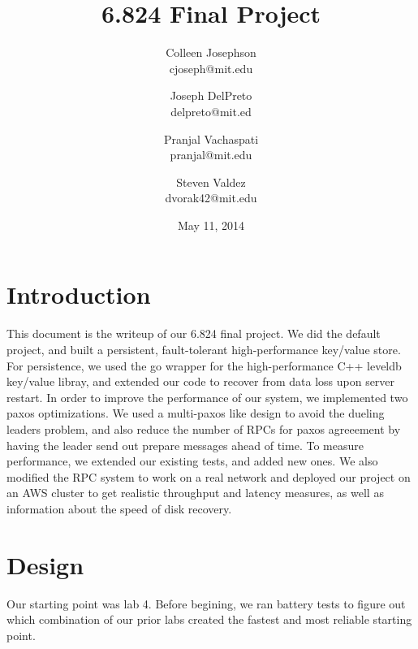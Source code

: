 \documentclass[letterpaper,10pt]{article}
\begin{document}
\title{\Large \bf 6.824 Final Project}
\author{
{\rm Colleen Josephson}\\
cjoseph@mit.edu
\and
{\rm Joseph DelPreto}\\
delpreto@mit.ed
\and
{\rm Pranjal Vachaspati}\\
pranjal@mit.edu
\and
{\rm Steven Valdez}\\
dvorak42@mit.edu
} %

\date{May 11, 2014}

\maketitle


\section{Introduction}
This document is the writeup of our 6.824 final project. We did the
default project, and built a persistent, fault-tolerant
high-performance key/value store. For persistence, we used the go
wrapper for the high-performance C++ leveldb key/value libray, and
extended our code to recover from data loss upon server restart. In
order to improve the performance of our system, we implemented two
paxos optimizations. We used a multi-paxos like design to avoid the
dueling leaders problem, and also reduce the number of RPCs for paxos
agreeement by having the leader send out prepare messages ahead of
time. To measure performance, we extended our existing tests, and
added new ones. We also modified the RPC system to work on a real
network and deployed our project on an AWS cluster to get realistic
throughput and latency measures, as well as information about the
speed of disk recovery.

\section{Design} \label{sec:design}
Our starting point was lab 4. Before begining, we ran battery tests to
figure out which combination of our prior labs created the fastest and
most reliable starting point. 
\end{document}
